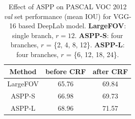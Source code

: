 \begin{table}[!t]
  \centering
  \addtolength{\tabcolsep}{0pt}
  \begin{tabular} {c | c c }
    \toprule[0.2em]
    {\bf Method} & {\bf before CRF} & {\bf after CRF} \\
    \toprule[0.2em]
    LargeFOV & 65.76 & 69.84 \\
    ASPP-S   & 66.98 & 69.73 \\
    ASPP-L   & 68.96 & 71.57 \\
    \bottomrule[0.1em]
  \end{tabular}
  \caption{Effect of ASPP on PASCAL VOC 2012 \textit{val} set
    performance (mean IOU) for VGG-16 based DeepLab model.
    {\bf LargeFOV}: single branch, $r = 12$.
    {\bf ASPP-S}: four branches, $r$ = \{2, 4, 8, 12\}.
    {\bf ASPP-L}: four branches, $r$ = \{6, 12, 18, 24\}.}
  \label{tab:vgg_mfov}
\end{table}

